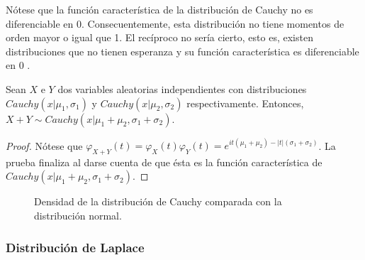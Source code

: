 \documentclass{article}
\begin{document}
Nótese que la función característica de la distribución de Cauchy no es diferenciable en $0$. Consecuentemente, esta distribución no tiene momentos de orden mayor o igual que 1. El recíproco no sería cierto, esto es, existen distribuciones que no tienen esperanza y su función característica es diferenciable en $0$ \cite{char}.

\begin{prop}
    Sean $X$ e $Y$ dos variables aleatorias independientes con distribuciones $Cauchy(x|\mu_1, \sigma_1)$ y $Cauchy(x|\mu_2, \sigma_2)$ respectivamente. Entonces, $X+Y \sim Cauchy(x|\mu_1+\mu_2,\sigma_1+\sigma_2)$.
\end{prop}
\begin{proof}
    Nótese que $\varphi_{X+Y}(t) = \varphi_{X}(t)\varphi_{Y}(t) = e^{it(\mu_1+\mu_2) - |t| (\sigma_1+\sigma_2)}$. La prueba finaliza al darse cuenta de que ésta es la función característica de $Cauchy(x|\mu_1+\mu_2,\sigma_1+\sigma_2)$.
\end{proof}

\begin{figure}[H]
    \caption{Densidad de la distribución de Cauchy comparada con la distribución normal.}
    \label{fig:cauchy}
\end{figure}


\subsubsection{Distribución de Laplace}
\end{document}
